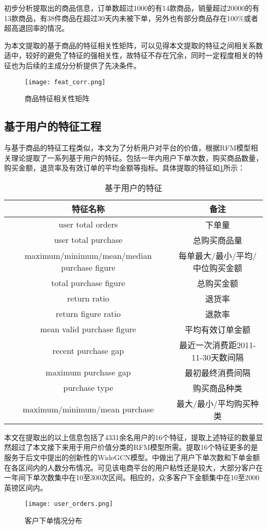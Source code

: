 \documentclass[lang=cn,11pt,a4paper,cite=authoryear]{elegantpaper}
\begin{document}
初步分析提取出的商品信息，订单数超过1000的有14款商品，销量超过20000的有13款商品，有38件商品在超过30天内未被下单，另外也有部分商品存在100\%或者超高退回率的情况。

为本文提取的基于商品的特征相关性矩阵，可以见得本文提取的特征之间相关系数适中，较好的避免了特征的强相关性，故特征不存在冗余，同时一定程度相关的特征也为后续的主成分分析提供了先决条件。
\begin{figure}[H]
  \centering
  \texttt{[image: feat\_corr.png]}
  \caption{商品特征相关性矩阵}
  \label{商品特征相关性矩阵}
\end{figure}

\subsection{基于用户的特征工程}
与基于商品的特征工程类似，本文为了分析用户对平台的价值，根据RFM模型相关理论提取了一系列基于用户的特征。包括一年内用户下单次数，购买商品数量，购买金额，退货率及有效订单的平均金额等指标。具体提取的特征如\ref{基于用户的特征}所示：
\begin{center}
\begin{longtable}{c|c}
    \caption{基于用户的特征}
    \label{基于用户的特征}\\
    \hline
      \textbf{特征名称} & \textbf{备注} \\
      \hline
      user total orders  & 下单量 \\
      user total purchase  & 总购买商品量 \\
      maximum/minimum/mean/median purchase figure & 每单最大/最小/平均/中位购买金额  \\
      total purchase figure   & 总购买金额 \\
      return ratio & 退货率 \\
      return figure ratio & 退款率 \\
      mean valid purchase figure & 平均有效订单金额 \\
      recent purchase gap & 最近一次消费距2011-11-30天数间隔 \\
      maximum purchase gap & 最初最终消费间隔 \\
      purchase type & 购买商品种类 \\
      maximum/minimum/mean purchase  & 最大/最小/平均购买种类 \\
      \hline
  \end{longtable}
\end{center}

本文在提取出的以上信息包括了4331余名用户的16个特征，提取上述特征的数量显然超过了本文接下来用于用户价值分类的RFM模型所需。提取16个特征更多的是服务于后文中提出的创新性的WideGCN模型。中做出了用户下单次数和下单金额在各区间内的人数分布情况。可见该电商平台的用户粘性还是较大，大部分客户在一年间下单次数集中在10至300次区间。相应的，众多客户下金额集中在10至2000英镑区间内。
\begin{figure}[H]
  \centering
  \texttt{[image: user\_orders.png]}
  \caption{客户下单情况分布}
  \label{客户下单情况分布}
\end{figure}
\end{document}
